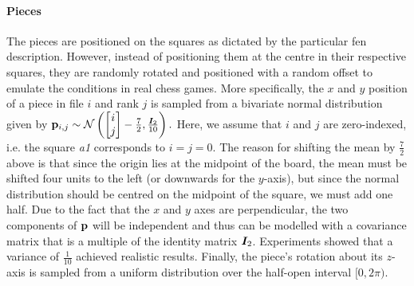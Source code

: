 \documentclass[../main.tex]{subfiles}
\begin{document}
\paragraph{Pieces}
The pieces are positioned on the squares as dictated by the particular \gls{fen} description.
However, instead of positioning them at the centre in their respective squares, they are randomly rotated and positioned with a random offset to emulate the conditions in real chess games.
More specifically, the $x$ and $y$ position of a piece in file $i$ and rank $j$ is sampled from a bivariate normal distribution given by
\(
    {\mathbf{p}}_{i,j} \sim \mathcal{N} \left(
        \begin{bmatrix}
            i \\ j
        \end{bmatrix} - \frac{7}{2},
        \frac{{\bm{I}}_2}{10}
    \right).
\)
Here, we assume that $i$ and $j$ are zero-indexed, i.e. the square \emph{a1} corresponds to $i=j=0$.
The reason for shifting the mean by $\frac{7}{2}$ above is that since the origin lies at the midpoint of the board, the mean must be shifted four units to the left (or downwards for the $y$-axis), but since the normal distribution should be centred on the midpoint of the square, we must add one half.
Due to the fact that the $x$ and $y$ axes are perpendicular, the two components of ${\mathbf{p}}$ will be independent and thus can be modelled with a covariance matrix that is a multiple of the identity matrix ${\bm{I}}_2$.
Experiments showed that a variance of $\frac{1}{10}$ achieved realistic results.
Finally, the piece's rotation about its $z$-axis is sampled from a uniform distribution over the half-open interval $[0, 2\pi)$.
\end{document}
